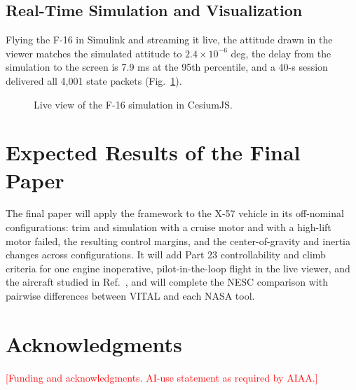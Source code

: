 \documentclass[conf]{new-aiaa}
\newcommand{\tbd}[1]{\textcolor{red}{[#1]}}
\begin{document}
\subsection{Real-Time Simulation and Visualization}
Flying the F-16 in Simulink and streaming it live, the attitude drawn in the viewer matches the
simulated attitude to $2.4\times10^{-6}$ deg, the delay from the simulation to the screen is
7.9 ms at the 95th percentile, and a 40-s session delivered all 4,001 state packets
(Fig.~\ref{fig:cesium}).

\begin{figure}[hbt!]
\centering
\fbox{\parbox[c][2.0in][c]{0.6\textwidth}{\centering\tbd{Screenshot: live CesiumJS view of the
F-16 over Edwards Air Force Base}}}
\caption{\label{fig:cesium} Live view of the F-16 simulation in CesiumJS.}
\end{figure}

\section{Expected Results of the Final Paper}
The final paper will apply the framework to the X-57 vehicle in its off-nominal
configurations: trim and simulation with a cruise motor and with a high-lift motor failed, the
resulting control margins, and the center-of-gravity and inertia changes across
configurations. It will add Part 23 controllability and climb criteria for one engine
inoperative, pilot-in-the-loop flight in the live viewer, and the aircraft studied in
Ref.~\cite{gould2025falco}, and will complete the NESC comparison with pairwise differences
between VITAL and each NASA tool.

\section*{Acknowledgments}
\tbd{Funding and acknowledgments. AI-use statement as required by AIAA.}
\end{document}
